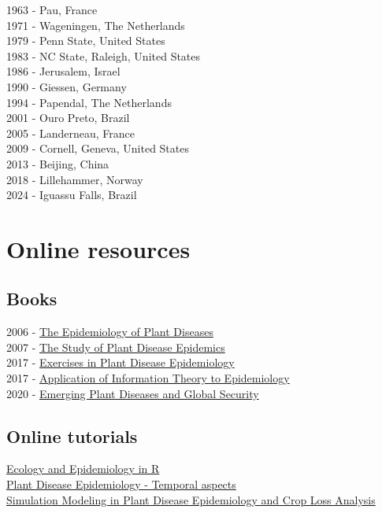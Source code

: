 \documentclass[
  letterpaper,
  DIV=11,
  numbers=noendperiod]{scrreprt}
\begin{document}
1963 - Pau, France\\
1971 - Wageningen, The Netherlands\\
1979 - Penn State, United States\\
1983 - NC State, Raleigh, United States\\
1986 - Jerusalem, Israel\\
1990 - Giessen, Germany\\
1994 - Papendal, The Netherlands\\
2001 - Ouro Preto, Brazil\\
2005 - Landerneau, France\\
2009 - Cornell, Geneva, United States\\
2013 - Beijing, China\\
2018 - Lillehammer, Norway\\
2024 - Iguassu Falls, Brazil

\hypertarget{online-resources}{%
\section{Online resources}\label{online-resources}}

\hypertarget{books}{%
\subsection{Books}\label{books}}

2006 - \href{https://link.springer.com/book/10.1007/1-4020-4581-6}{The
Epidemiology of Plant Diseases}\\
2007 -
\href{https://apsjournals.apsnet.org/doi/book/10.1094/9780890545058}{The
Study of Plant Disease Epidemics}\\
2017 -
\href{https://apsjournals.apsnet.org/doi/book/10.1094/9780890544426}{Exercises
in Plant Disease Epidemiology}\\
2017 -
\href{https://apsjournals.apsnet.org/doi/book/10.1094/9780890544877}{Application
of Information Theory to Epidemiology}\\
2020 -
\href{https://apsjournals.apsnet.org/doi/book/10.1094/9780890546383}{Emerging
Plant Diseases and Global Security}\\

\hypertarget{online-tutorials}{%
\subsection{Online tutorials}\label{online-tutorials}}

\href{https://www.apsnet.org/edcenter/disimpactmngmnt/topc/EcologyAndEpidemiologyInR/Pages/default.aspx}{Ecology
and Epidemiology in R}\\
\href{https://www.apsnet.org/edcenter/disimpactmngmnt/topc/EpidemiologyTemporal/Pages/default.aspx}{Plant
Disease Epidemiology - Temporal aspects}\\
\href{https://www.apsnet.org/edcenter/disimpactmngmnt/topc/BotanicalEpidemiology/Pages/default.aspx}{Simulation
Modeling in Plant Disease Epidemiology and Crop Loss Analysis}
\end{document}
